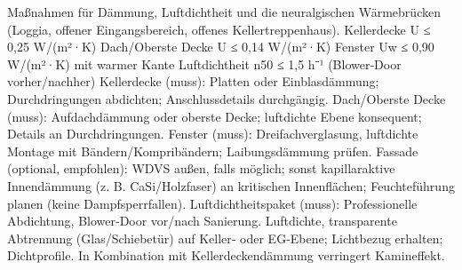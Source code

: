 \markdownRendererDocumentBegin
\markdownRendererSectionBegin
{}\markdownRendererInterblockSeparator
{}Maßnahmen für Dämmung, Luftdichtheit und die neuralgischen Wärmebrücken (Loggia, offener Eingangsbereich, offenes Kellertreppenhaus).\markdownRendererInterblockSeparator
{}\markdownRendererSectionBegin
{}\markdownRendererInterblockSeparator
{}\markdownRendererUlBeginTight
\markdownRendererUlItem Kellerdecke U ≤ 0,25 W/(m²·K)\markdownRendererUlItemEnd 
\markdownRendererUlItem Dach/Oberste Decke U ≤ 0,14 W/(m²·K)\markdownRendererUlItemEnd 
\markdownRendererUlItem Fenster Uw ≤ 0,90 W/(m²·K) mit warmer Kante\markdownRendererUlItemEnd 
\markdownRendererUlItem Luftdichtheit n50 ≤ 1,5 h⁻¹ (Blower‑Door vorher/nachher)\markdownRendererUlItemEnd 
\markdownRendererUlEndTight \markdownRendererInterblockSeparator
{}
\markdownRendererSectionEnd \markdownRendererSectionBegin
{}\markdownRendererInterblockSeparator
{}\markdownRendererUlBeginTight
\markdownRendererUlItem Kellerdecke (muss): Platten oder Einblasdämmung; Durchdringungen abdichten; Anschlussdetails durchgängig.\markdownRendererUlItemEnd 
\markdownRendererUlItem Dach/Oberste Decke (muss): Aufdachdämmung oder oberste Decke; luftdichte Ebene konsequent; Details an Durchdringungen.\markdownRendererUlItemEnd 
\markdownRendererUlItem Fenster (muss): Dreifachverglasung, luftdichte Montage mit Bändern/Kompribändern; Laibungsdämmung prüfen.\markdownRendererUlItemEnd 
\markdownRendererUlItem Fassade (optional, empfohlen): WDVS außen, falls möglich; sonst kapillaraktive Innendämmung (z. B. CaSi/Holzfaser) an kritischen Innenflächen; Feuchteführung planen (keine Dampfsperrfallen).\markdownRendererUlItemEnd 
\markdownRendererUlItem Luftdichtheitspaket (muss): Professionelle Abdichtung, Blower‑Door vor/nach Sanierung.\markdownRendererUlItemEnd 
\markdownRendererUlEndTight \markdownRendererInterblockSeparator
{}
\markdownRendererSectionEnd \markdownRendererSectionBegin
{}\markdownRendererInterblockSeparator
{}\markdownRendererUlBeginTight
\markdownRendererUlItem Luftdichte, transparente Abtrennung (Glas/Schiebetür) auf Keller‑ oder EG‑Ebene; Lichtbezug erhalten; Dichtprofile.\markdownRendererUlItemEnd 
\markdownRendererUlItem In Kombination mit Kellerdeckendämmung verringert Kamineffekt.\markdownRendererUlItemEnd 
\markdownRendererUlEndTight \markdownRendererInterblockSeparator
{}
\markdownRendererSectionEnd \markdownRendererSectionBegin
